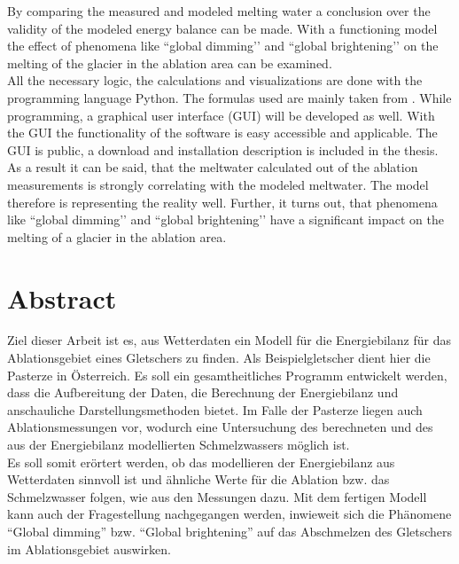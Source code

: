 \documentclass[12pt,a4paper]{article}
\begin{document}
By comparing the measured and modeled melting water a conclusion over the validity of the modeled energy balance can be made. With a functioning model the effect of phenomena like ``global dimming’’ and ``global brightening’’ on the melting of the glacier in the ablation area can be examined.\\

All the necessary logic, the calculations and visualizations are done with the programming language Python. The formulas used are mainly taken from \cite[153-157]{ThePhysicsOfGlaciers}. While programming, a graphical user interface (GUI) will be developed as well. With the GUI the functionality of the software is easy accessible and applicable. The GUI is public, a download and installation description is included in the thesis.\\

 As a result it can be said, that the meltwater calculated out of the ablation measurements is strongly correlating with  the modeled meltwater. The model therefore is representing the reality well. Further, it turns out, that phenomena like ``global dimming’’ and ``global brightening’’ have a significant impact on the melting of a glacier in the ablation area.
 
\pagebreak
\section*{Abstract}

Ziel dieser Arbeit ist es, aus Wetterdaten ein Modell für die Energiebilanz für das Ablationsgebiet eines Gletschers zu finden. Als Beispielgletscher dient hier die Pasterze in Österreich. Es soll ein gesamtheitliches Programm entwickelt werden, dass die Aufbereitung der Daten, die Berechnung der Energiebilanz und anschauliche Darstellungsmethoden bietet. Im Falle der Pasterze liegen auch Ablationsmessungen vor, wodurch eine Untersuchung des berechneten und des aus der Energiebilanz modellierten Schmelzwassers möglich ist.\\

Es soll somit erörtert werden, ob das modellieren der Energiebilanz aus Wetterdaten sinnvoll ist und ähnliche Werte für die Ablation bzw. das Schmelzwasser folgen, wie aus den Messungen dazu. Mit dem fertigen Modell kann auch der Fragestellung nachgegangen werden, inwieweit sich die Phänomene ``Global dimming'' bzw. ``Global brightening'' auf das Abschmelzen des Gletschers im Ablationsgebiet auswirken.\\
\end{document}

